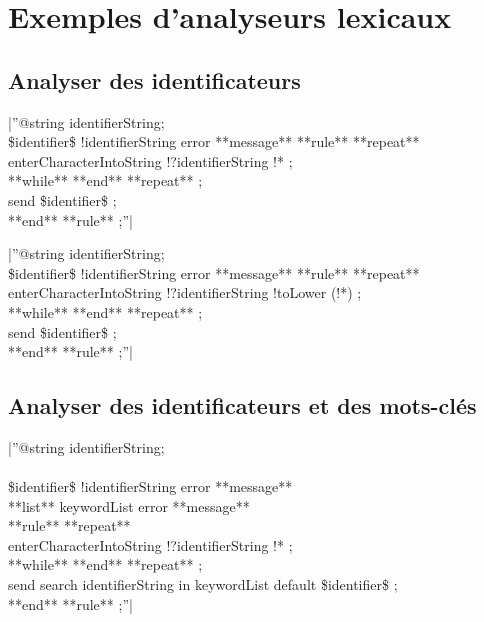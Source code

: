 {%

\section{Exemples d'analyseurs lexicaux}

\subsection{Analyser des identificateurs}

|''@string identifierString;\\ 
\$identifier\$ !identifierString error **message** %
**rule** %
 **repeat**\\ 
  enterCharacterIntoString !?identifierString !* ;\\ 
 **while** %
 **end** **repeat** ;\\ 
 send \$identifier\$ ;\\
**end** **rule** ;''|

|''@string identifierString;\\ 
\$identifier\$ !identifierString error **message** %
**rule** %
 **repeat**\\ 
  enterCharacterIntoString !?identifierString !toLower (!*) ;\\ 
 **while** %
 **end** **repeat** ;\\ 
 send \$identifier\$ ;\\
**end** **rule** ;''|

\subsection{Analyser des identificateurs et des mots-clés}

|''@string identifierString;\\ 
\\ 
\$identifier\$ !identifierString error **message** %
\\ 
**list** keywordList error **message** %
\\ 
**rule** %
 **repeat**\\ 
  enterCharacterIntoString !?identifierString !* ;\\ 
 **while** %
 **end** **repeat** ;\\ 
 send search identifierString in keywordList  default \$identifier\$ ;\\
**end** **rule** ;''|

}

